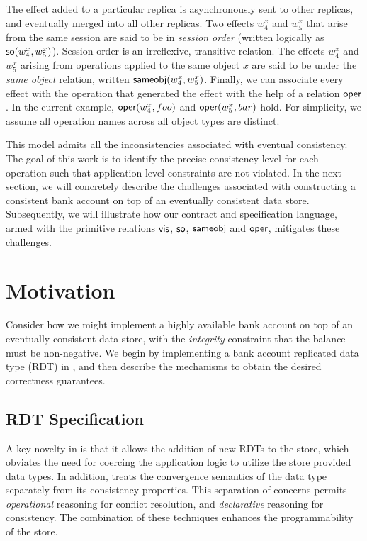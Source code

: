 The effect added to a particular replica is asynchronously sent to other
replicas, and eventually merged into all other replicas. Two effects $w^x_4$
and $w^x_5$ that arise from the same session are said to be in \emph{session
order} (written logically as ${\normalfont \textsf{so}(w^x_4,w^x_5)}$). Session order is an
irreflexive, transitive relation. The effects $w^x_4$ and $w^x_5$ arising from
operations applied to the same object $x$ are said to be under the \emph{same
object} relation, written ${\normalfont \textsf{sameobj}(w^x_4,w^x_5)}$. Finally, we can associate
every effect with the operation that generated the effect with the help of a
relation ${\normalfont \textsf{oper}}$. In the current example, ${\normalfont \textsf{oper}(w^x_4,foo)}$ and
${\normalfont \textsf{oper}(w^x_5,bar)}$ hold. For simplicity, we assume all operation names across
all object types are distinct.

This model admits all the inconsistencies associated with eventual consistency.
The goal of this work is to identify the precise consistency level for each
operation such that application-level constraints are not violated. In the next
section, we will concretely describe the challenges associated with
constructing a consistent bank account on top of an eventually consistent data
store. Subsequently, we will illustrate how our contract and specification
language, armed with the primitive relations ${\normalfont \textsf{vis}}$, ${\normalfont \textsf{so}}$, ${\normalfont \textsf{sameobj}}$ and
${\normalfont \textsf{oper}}$, mitigates these challenges.

\section{Motivation}
\label{q_sec:motivation}

Consider how we might implement a highly available bank account on top of an
eventually consistent data store, with the \emph{integrity} constraint that the
balance must be non-negative. We begin by implementing a bank account
replicated data type (RDT) in \quelea, and then describe the mechanisms to
obtain the desired correctness guarantees.

\subsection{RDT Specification}

A key novelty in \quelea is that it allows the addition of new RDTs to the
store, which obviates the need for coercing the application logic to utilize
the store provided data types. In addition, \quelea treats the convergence
semantics of the data type separately from its consistency properties. This
separation of concerns permits \emph{operational} reasoning for conflict
resolution, and \emph{declarative} reasoning for consistency. The combination
of these techniques enhances the programmability of the store.

